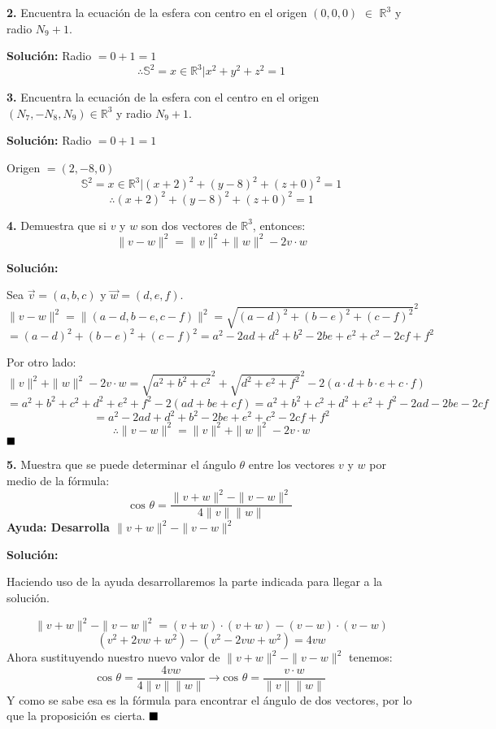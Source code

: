 \documentclass{article}
\begin{document}
\textbf{2.} Encuentra la ecuación de la esfera con centro en el origen $(0,0,0)$ $\in$ $\mathbb{R}^3$ y radio $N_9+1$.
\vspace{10pt}


\textbf{Solución:}
Radio $=0+1 = 1$
$$\therefore \mathbb{S}^2={x \in \mathbb{R}^3| x^2+y^2+z^2 = 1}$$


\textbf{3.} Encuentra la ecuación de la esfera con el centro en el origen $(N_7, -N_8, N_9) \in \mathbb{R}^3$ y radio $N_9+1$.
\vspace{10pt}


\textbf{Solución:}
Radio $= 0+1 = 1$
\par
Origen $= (2, -8 ,  0)$
$$ \mathbb{S}^2={x \in \mathbb{R}^3| (x+2)^2+(y-8)^2+(z+0)^2 = 1}$$
$$\therefore (x+2)^2+(y-8)^2+(z+0)^2 = 1$$


\textbf{4.} Demuestra que si $v$ y $w$ son dos vectores de $\mathbb{R}^3$, entonces:
$$\|v-w\|^2 = \|v\|^2+\|w\|^2- 2v\cdot w$$


\textbf{Solución: }
\vspace{10pt}


Sea $\vec{v} = (a,b,c)$ y $\vec{w}=(d,e,f)$.
$$\|v-w\|^2 =\|(a-d,b-e,c-f)\|^2 = \sqrt{(a-d)^2+(b-e)^2+(c-f)^2}^2$$
$$= (a-d)^2+(b-e)^2+(c-f)^2 = a^2-2ad+d^2+b^2-2be+e^2+c^2-2cf+f^2$$


Por otro lado:
$$\|v\|^2+\|w\|^2- 2v\cdot w = \sqrt{a^2+b^2+c^2}^2 +\sqrt{d^2+e^2+f^2}^2-2(a\cdot d+b\cdot e + c\cdot f)$$
$$= a^2+b^2+c^2+d^2+e^2+f^2 -2(ad+be+cf) = a^2+b^2+c^2+d^2+e^2+f^2 -2ad -2be-2cf$$
$$= a^2-2ad+d^2+b^2-2be+e^2+c^2-2cf+f^2$$
$$\therefore \|v-w\|^2 = \|v\|^2+\|w\|^2- 2v\cdot w$$
\vspace{10pt}
$\hfill\blacksquare$
\vspace{10pt}


\textbf{5.} Muestra que se puede determinar el ángulo $\theta$ entre los vectores $v$ y $w$ por medio de
la fórmula:
$$\text{cos }\theta = \frac{\|v+w\|^2-\|v-w\|^2}{4\|v\|\|w\|}$$
\textbf{Ayuda: Desarrolla $\|v+w\|^2-\|v-w\|^2$}
\vspace{10pt}


\textbf{Solución:} \par
Haciendo uso de la ayuda desarrollaremos la parte indicada para llegar a la solución. \par
$$\|v+w\|^2-\|v-w\|^2 = (v+w)\cdot(v+w)-(v-w)\cdot(v-w)$$
$$(v^2+2vw+w^2)-(v^2-2vw+w^2) = 4vw$$
Ahora sustituyendo nuestro nuevo valor de $\|v+w\|^2-\|v-w\|^2$ tenemos:
$$\text{cos }\theta = \frac{4vw}{4\|v\|\|w\|} \rightarrow \text{cos }\theta = \frac{v\cdot w}{\|v\|\|w\|}$$
Y como se sabe esa es la fórmula para encontrar el ángulo de dos vectores, por lo que la proposición es
cierta.
$\hfill\blacksquare$
\end{document}
